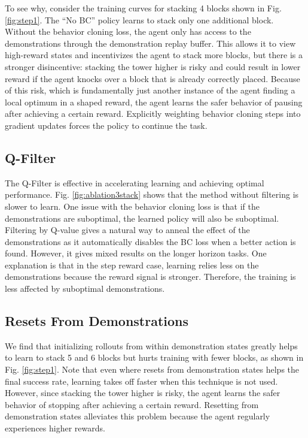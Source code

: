 To see why, consider the training curves for stacking 4 blocks shown in Fig. \ref{fig:step1}. The ``No BC'' policy learns to stack only one additional block. Without the behavior cloning loss, the agent only has access to the demonstrations through the demonstration replay buffer. This allows it to view high-reward states and incentivizes the agent to stack more blocks, but there is a stronger disincentive: stacking the tower higher is risky and could result in lower reward if the agent knocks over a block that is already correctly placed. Because of this risk, which is fundamentally just another instance of the agent finding a local optimum in a shaped reward, the agent learns the safer behavior of pausing after achieving a certain reward. Explicitly weighting behavior cloning steps into gradient updates forces the policy to continue the task.

\subsection{Q-Filter} 

The Q-Filter is effective in accelerating learning and achieving optimal performance. Fig. \ref{fig:ablation3stack} shows that the method without filtering is slower to learn. One issue with the behavior cloning loss is that if the demonstrations are suboptimal, the learned policy will also be suboptimal. Filtering by Q-value gives a natural way to anneal the effect of the demonstrations as it automatically disables the BC loss when a better action is found. However, it gives mixed results on the longer horizon tasks. One explanation is that in the step reward case, learning relies less on the demonstrations because the reward signal is stronger. Therefore, the training is less affected by suboptimal demonstrations.

\subsection{Resets From Demonstrations}

We find that initializing rollouts from within demonstration states greatly helps to learn to stack 5 and 6 blocks but hurts training with fewer blocks, as shown in Fig. \ref{fig:step1}. Note that even where resets from demonstration states helps the final success rate, learning takes off faster when this technique is not used. However, since stacking the tower higher is risky, the agent learns the safer behavior of stopping after achieving a certain reward. Resetting from demonstration states alleviates this problem because the agent regularly experiences higher rewards.

